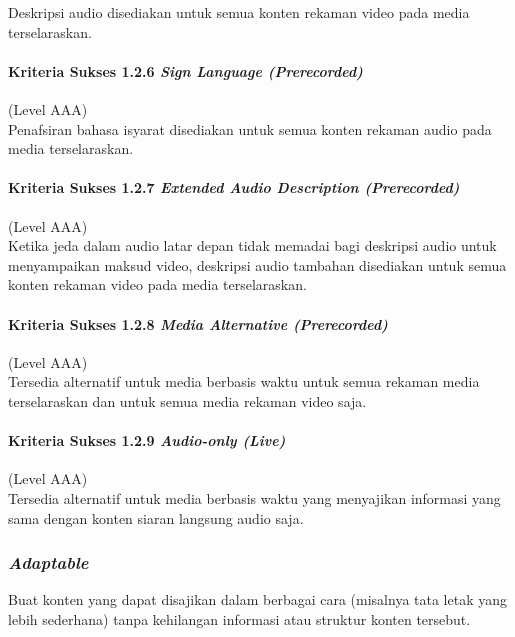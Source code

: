 Deskripsi audio disediakan untuk semua konten rekaman video pada media terselaraskan.

\paragraph{Kriteria Sukses 1.2.6 \textit{Sign Language (Prerecorded)}}
\label{sec:kriteria_sukses_1.2.6}
(Level AAA)\\

Penafsiran bahasa isyarat disediakan untuk semua konten rekaman audio pada media terselaraskan. 

\paragraph{Kriteria Sukses 1.2.7 \textit{Extended Audio Description (Prerecorded)}}
\label{sec:kriteria_sukses_1.2.7}
(Level AAA)\\

Ketika jeda dalam audio latar depan tidak memadai bagi deskripsi audio untuk menyampaikan maksud video, deskripsi audio tambahan disediakan untuk semua konten rekaman video pada media terselaraskan.

\paragraph{Kriteria Sukses 1.2.8 \textit{Media Alternative (Prerecorded)}}
\label{sec:kriteria_sukses_1.2.8}
(Level AAA)\\

Tersedia alternatif untuk media berbasis waktu untuk semua rekaman media terselaraskan dan untuk semua media rekaman video saja.

\paragraph{Kriteria Sukses 1.2.9 \textit{Audio-only (Live)}}
\label{sec:kriteria_sukses_1.2.9}
(Level AAA)\\

Tersedia alternatif untuk media berbasis waktu yang menyajikan informasi yang sama dengan konten siaran langsung audio saja.

\subsubsection{\textit{Adaptable}}
\label{sec:adaptable}
Buat konten yang dapat disajikan dalam berbagai cara (misalnya tata letak yang lebih sederhana) tanpa kehilangan informasi atau struktur konten tersebut.


